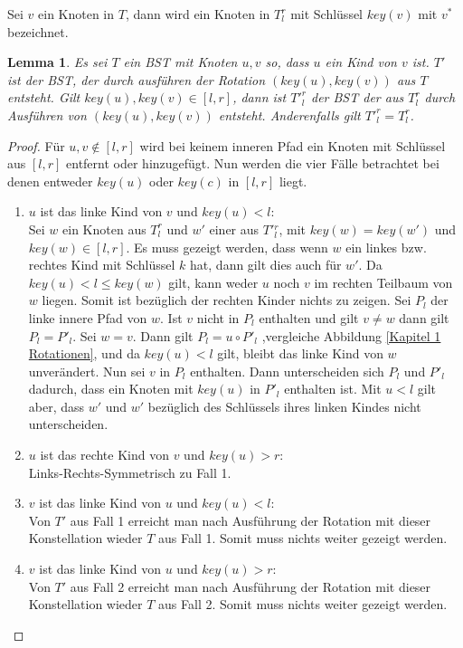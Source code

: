 \documentclass[a4paper,12pt]{article}
\begin{document}
 \noindent Sei $v$ ein Knoten in $T$, dann wird ein Knoten in $T^r_l$ mit Schlüssel $\mathit{key}(v)$  mit $v^*$ bezeichnet.  
\newtheorem{Lemma3}{Lemma}[section] \label{lemmaWilber1}
\begin{Lemma3} Es sei $T$ ein BST mit Knoten $u, v$ so, dass $u$ ein Kind von $v$ ist. $T'$ ist der BST, der durch ausführen der Rotation $\left(\mathit{key}\left(u\right),\mathit{key}\left(v\right)\right)$ aus $T$ entsteht. Gilt $\mathit{key}\left(u\right),\mathit{key}\left(v\right) \in \left[l,r\right]$, dann ist ${T'}^r_l$ der BST der aus $T^r_l$ durch Ausführen von  $\left(\mathit{key}\left(u\right),\mathit{key}\left(v\right)\right)$ entsteht. Anderenfalls gilt ${T'}^r_l = T^r_l$.
\end{Lemma3}
\begin{proof}
\noindent Für $u,v \notin \left[l,r\right]$ wird bei keinem inneren Pfad ein Knoten mit Schlüssel aus $\left[l,r\right]$ entfernt oder hinzugefügt.
Nun werden die vier Fälle betrachtet bei denen entweder $\mathit{key}\left(u\right)$ oder $\mathit{key}\left(c\right)$ in $\left[l,r\right]$ liegt.
\begin{enumerate}
	\item $u$ ist das linke Kind von $v$ und $\mathit{key}\left(u\right) < l$:\\
	 Sei $w$ ein Knoten aus $T^r_l$ und $w'$ einer aus $T'{^r_l}$, mit $\mathit{key}(w) = \mathit{key}(w')$ und $\mathit{key}(w) \in \left[l,r\right]$. Es muss gezeigt werden, dass wenn $w$ ein linkes bzw. rechtes Kind mit Schlüssel $k$ hat, dann gilt dies auch für $w'$. Da $\mathit{key}(u) < l \leq \mathit{key}(w) $ gilt, kann weder $u$ noch $v$ im rechten Teilbaum von $w$ liegen. Somit ist bezüglich der rechten Kinder nichts zu zeigen. 
	Sei $P_l$ der linke innere Pfad von $w$. Ist $v$ nicht in $P_l$ enthalten und gilt $v \neq w$ dann gilt $P_l = P'_l$. Sei $w = v$. Dann gilt $P_l = u  \circ  P'_l$ ,vergleiche Abbildung \ref{Kapitel 1 Rotationen}, und da $\mathit{key}(u) < l$ gilt, bleibt das linke Kind von $w$ unverändert. Nun sei $v$ in $P_l$ enthalten. Dann unterscheiden sich  $P_l$ und  $P'_l$ dadurch, dass ein Knoten mit $\mathit{key}(u)$ in $P'_l$ enthalten ist. Mit $u < l$ gilt aber, dass $w'$ und $w'$ bezüglich des Schlüssels ihres linken Kindes nicht unterscheiden.
	\item $u$ ist das rechte Kind von $v$ und $\mathit{key}\left(u\right) > r$:\\
	Links-Rechts-Symmetrisch zu Fall 1. 
	\item $v$ ist das linke Kind von $u$ und $\mathit{key}\left(u\right) < l$:\\
	    Von $T'$ aus Fall 1 erreicht man nach Ausführung der Rotation mit dieser Konstellation wieder $T$ aus Fall 1. Somit muss nichts weiter gezeigt werden.
	\item $v$ ist das linke Kind von $u$ und $\mathit{key}\left(u\right) > r$:\\
	Von $T'$ aus Fall 2 erreicht man nach Ausführung der Rotation mit dieser Konstellation wieder $T$ aus Fall 2. Somit muss nichts weiter gezeigt werden.\\
       	    

\end{enumerate}
\end{proof}
\end{document}
